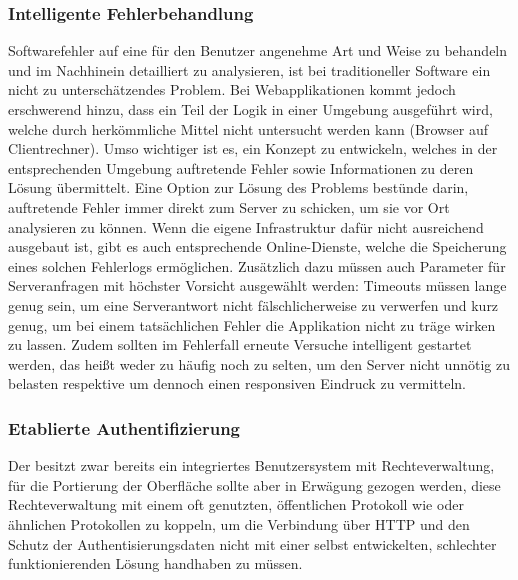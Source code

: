 \subsubsection{Intelligente Fehlerbehandlung}
Softwarefehler auf eine für den Benutzer angenehme Art und Weise zu behandeln und im Nachhinein detailliert zu analysieren, ist bei traditioneller Software ein nicht zu unterschätzendes Problem. Bei Webapplikationen kommt jedoch erschwerend hinzu, dass ein Teil der Logik in einer Umgebung ausgeführt wird, welche durch herkömmliche Mittel nicht untersucht werden kann (Browser auf Clientrechner). Umso wichtiger ist es, ein Konzept zu entwickeln, welches in der entsprechenden Umgebung auftretende Fehler sowie Informationen zu deren Lösung übermittelt. Eine Option zur Lösung des Problems bestünde darin, auftretende Fehler immer direkt zum Server zu schicken, um sie vor Ort analysieren zu können. Wenn die eigene Infrastruktur dafür nicht ausreichend ausgebaut ist, gibt es auch entsprechende Online-Dienste, welche die Speicherung eines solchen Fehlerlogs ermöglichen. Zusätzlich dazu müssen auch Parameter für Serveranfragen mit höchster Vorsicht ausgewählt werden: Timeouts müssen lange genug sein, um eine Serverantwort nicht fälschlicherweise zu verwerfen und kurz genug, um bei einem tatsächlichen Fehler die Applikation nicht zu träge wirken zu lassen. Zudem sollten im Fehlerfall erneute Versuche intelligent gestartet werden, das heißt weder zu häufig noch zu selten, um den Server nicht unnötig zu belasten respektive um dennoch einen responsiven Eindruck zu vermitteln.

\subsubsection{Etablierte Authentifizierung}
Der  besitzt zwar bereits ein integriertes Benutzersystem mit Rechteverwaltung, für die Portierung der Oberfläche sollte aber in Erwägung gezogen werden, diese Rechteverwaltung mit einem oft genutzten, öffentlichen Protokoll wie  oder ähnlichen Protokollen zu koppeln, um die Verbindung über HTTP und den Schutz der Authentisierungsdaten nicht mit einer selbst entwickelten, schlechter funktionierenden Lösung handhaben zu müssen.

